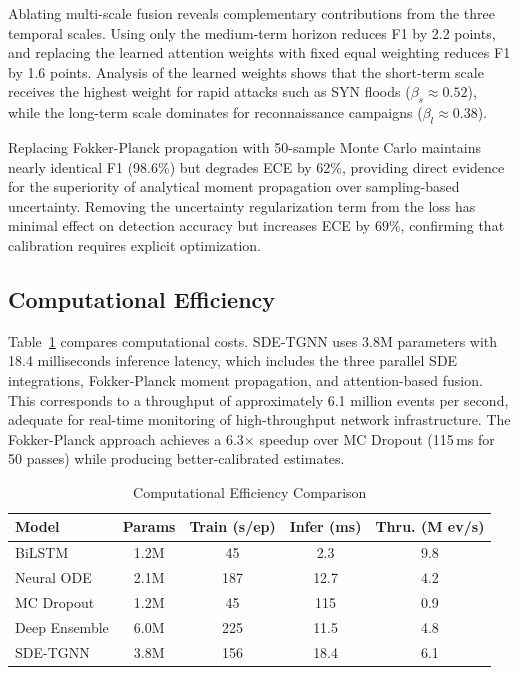 \documentclass[journal]{IEEEtran}
\begin{document}
Ablating multi-scale fusion reveals complementary contributions from the three temporal scales. Using only the medium-term horizon reduces F1 by 2.2 points, and replacing the learned attention weights with fixed equal weighting reduces F1 by 1.6 points. Analysis of the learned weights shows that the short-term scale receives the highest weight for rapid attacks such as SYN floods ($\beta_s \approx 0.52$), while the long-term scale dominates for reconnaissance campaigns ($\beta_l \approx 0.38$).

Replacing Fokker-Planck propagation with 50-sample Monte Carlo maintains nearly identical F1 (98.6\%) but degrades ECE by 62\%, providing direct evidence for the superiority of analytical moment propagation over sampling-based uncertainty. Removing the uncertainty regularization term from the loss has minimal effect on detection accuracy but increases ECE by 69\%, confirming that calibration requires explicit optimization.


\subsection{Computational Efficiency}

Table~\ref{tab:efficiency} compares computational costs. SDE-TGNN uses 3.8M parameters with 18.4 milliseconds inference latency, which includes the three parallel SDE integrations, Fokker-Planck moment propagation, and attention-based fusion. This corresponds to a throughput of approximately 6.1 million events per second, adequate for real-time monitoring of high-throughput network infrastructure. The Fokker-Planck approach achieves a 6.3$\times$ speedup over MC Dropout (115\,ms for 50 passes) while producing better-calibrated estimates.

\begin{table}[!t]
\centering
\caption{Computational Efficiency Comparison}
\label{tab:efficiency}
\footnotesize
\begin{tabular}{@{}lcccc@{}}
\toprule
Model & Params & Train (s/ep) & Infer (ms) & Thru. (M ev/s) \\
\midrule
BiLSTM & 1.2M & 45 & 2.3 & 9.8 \\
Neural ODE & 2.1M & 187 & 12.7 & 4.2 \\
MC Dropout & 1.2M & 45 & 115 & 0.9 \\
Deep Ensemble & 6.0M & 225 & 11.5 & 4.8 \\
SDE-TGNN & 3.8M & 156 & 18.4 & 6.1 \\
\bottomrule
\end{tabular}
\end{table}
\end{document}
